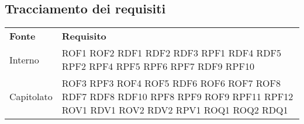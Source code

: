 \subsection{Tracciamento dei requisiti}
\begin{longtable}{| p{5cm} | p{5cm} |}
		\rowcolor{LightBlue}
		\color{white}\bfseries Fonte & \color{white}\bfseries Requisito \\[0.25cm]
		Interno & 	ROF1 \newline
					ROF2 \newline
					RDF1 \newline
					RDF2 \newline
					RDF3 \newline
					RPF1 \newline
					RDF4 \newline
					RDF5 \newline
					RPF2 \newline
					RPF4 \newline
					RPF5 \newline
					RPF6 \newline
					RPF7 \newline
					RDF9 \newline
					RPF10 \\
					
		Capitolato & 	ROF3 \newline
						RPF3\newline
						ROF4\newline
						ROF5\newline
						RDF6\newline
						ROF6\newline
						ROF7\newline
						ROF8\newline
						RDF7\newline
						RDF8\newline
						RDF10\newline
						RPF8\newline
						RPF9\newline
						ROF9\newline
						RPF11\newline
						RPF12\newline
						ROV1\newline
						RDV1\newline
						ROV2\newline
						RDV2\newline
						RPV1\newline
						ROQ1\newline
						ROQ2\newline
						RDQ1 \\
		

\end{longtable}

